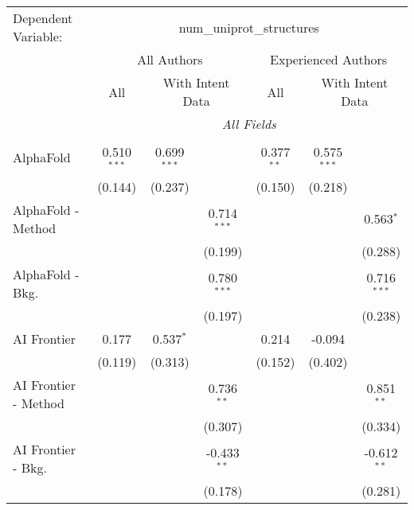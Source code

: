 \begingroup
\centering
\begin{tabular}{lcccccc}
   \tabularnewline \midrule \midrule
   Dependent Variable: & \multicolumn{6}{c}{num\_uniprot\_structures}\\
 & \multicolumn{3}{c}{All Authors} & \multicolumn{3}{c}{Experienced Authors} \\
\cmidrule(lr){2-4} \cmidrule(lr){5-7}
 & \multicolumn{1}{c}{All} & \multicolumn{2}{c}{With Intent Data} & \multicolumn{1}{c}{All} & \multicolumn{2}{c}{With Intent Data} \\
\cmidrule(lr){2-2} \cmidrule(lr){3-4} \cmidrule(lr){5-5} \cmidrule(lr){6-7}
 & \multicolumn{6}{c}{\textit{All Fields}} \\ \\
   AlphaFold            & 0.510$^{***}$ & 0.699$^{***}$ &               & 0.377$^{**}$ & 0.575$^{***}$ &   \\   
                        & (0.144)       & (0.237)       &               & (0.150)      & (0.218)       &   \\   
   AlphaFold - Method   &               &               & 0.714$^{***}$ &              &               & 0.563$^{*}$\\   
                        &               &               & (0.199)       &              &               & (0.288)\\   
   AlphaFold - Bkg.     &               &               & 0.780$^{***}$ &              &               & 0.716$^{***}$\\   
                        &               &               & (0.197)       &              &               & (0.238)\\   
   AI Frontier          & 0.177         & 0.537$^{*}$   &               & 0.214        & -0.094        &   \\   
                        & (0.119)       & (0.313)       &               & (0.152)      & (0.402)       &   \\   
   AI Frontier - Method &               &               & 0.736$^{**}$  &              &               & 0.851$^{**}$\\   
                        &               &               & (0.307)       &              &               & (0.334)\\   
   AI Frontier - Bkg.   &               &               & -0.433$^{**}$ &              &               & -0.612$^{**}$\\   
                        &               &               & (0.178)       &              &               & (0.281)\\   

\end{tabular}

